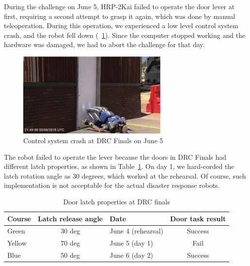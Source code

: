 During the challenge on June 5, HRP-2Kai failed to operate the door lever at first,
requiring a second attempt to grasp it again, which was done by manual teleoperation.
During this operation, we experienced a low level control system crash, and the robot
fell down (\figurename~\ref{fig:drc_door_aist_day1}).
Since the computer stopped working and the hardware was damaged, we had to abort the
challenge for that day. 
%
\begin{figure}[t]
  \centering
  \includegraphics[width = 7.5cm]{img/drc_door_aist_day1}
  \caption{Control system crash at DRC Finals on June 5~\cite{DARPA}}
  \label{fig:drc_door_aist_day1}
\end{figure}

The robot failed to operate the lever because the doors in DRC Finals had different
latch properties, as shown in Table~\ref{tbl:door_latch}.
On day 1, we hard-corded the latch rotation angle as 30 degrees,
which worked at the rehearsal.
Of course, such implementation is not acceptable for the actual disaster response robots.
%
\begin{table}[htb]
\caption{Door latch properties at DRC finals} \label{tbl:door_latch}
\begin{tabular}{lclc}
\hline
Course & Latch release angle & Date & Door task result  \\ 
\hline
Green & 30 deg & June 4 (rehearsal) & Success  \\
Yellow & 70 deg & June 5 (day 1) & Fail \\
Blue &  50 deg & June 6 (day 2)  & Success \\
\hline
\end{tabular}
\end{table}

